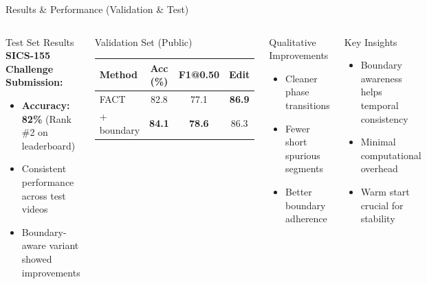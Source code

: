 \documentclass[9pt,aspectratio=169]{beamer}
\newcommand{\factmodel}{\textsc{FACT}\xspace}
\begin{document}
\begin{frame}[label=slide7]{Results \& Performance (Validation \& Test)}
  \begin{columns}[T,onlytextwidth]
      \begin{block}{Test Set Results}
        \textbf{SICS-155 Challenge Submission:}
        \begin{itemize}
          \item \textbf{Accuracy: 82\%} (Rank \#2 on leaderboard)
          \item Consistent performance across test videos
          \item Boundary-aware variant showed improvements
        \end{itemize}
      \end{block}
      
      \begin{block}{Validation Set (Public)}
        \vspace{0.5em}
        \centering
        \renewcommand{\arraystretch}{1.15}
        \begin{tabular}{lccc}
          \toprule
          \textbf{Method} & \textbf{Acc (\%)} & \textbf{F1@0.50} & \textbf{Edit} \\
          \midrule
          \factmodel & 82.8 & 77.1 & \textbf{86.9} \\
          + boundary & \textbf{84.1} & \textbf{78.6} & 86.3 \\
          \bottomrule
        \end{tabular}
        \vspace{0.5em}
      \end{block}
      
      \begin{block}{Qualitative Improvements}
        \begin{itemize}
          \item Cleaner phase transitions
          \item Fewer short spurious segments
          \item Better boundary adherence
        \end{itemize}
      \end{block}
      
      \begin{block}{Key Insights}
        \begin{itemize}
          \item Boundary awareness helps temporal consistency
          \item Minimal computational overhead
          \item Warm start crucial for stability
        \end{itemize}
      \end{block}
  \end{columns}
\end{frame}
\end{document}
